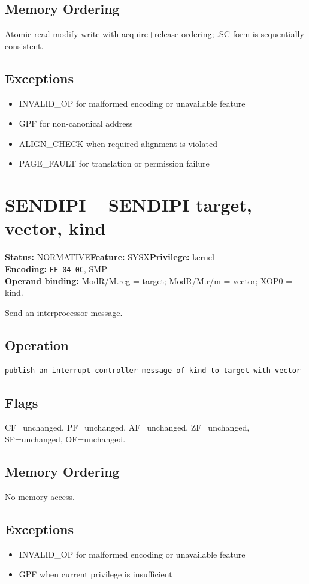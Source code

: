 \documentclass[10pt]{article}
\begin{document}
\subsection*{Memory Ordering}
Atomic read-modify-write with acquire+release ordering; .SC form is sequentially consistent.
\subsection*{Exceptions}
\begin{itemize}
\item INVALID\_OP for malformed encoding or unavailable feature
\item GPF for non-canonical address
\item ALIGN\_CHECK when required alignment is violated
\item PAGE\_FAULT for translation or permission failure
\end{itemize}
\clearpage

\section{SENDIPI -- SENDIPI target, vector, kind}
\textbf{Status:} NORMATIVE\quad \textbf{Feature:} SYSX\quad \textbf{Privilege:} kernel\\
\textbf{Encoding:} \texttt{FF 04 0C}, SMP\\
\textbf{Operand binding:} ModR/M.reg = target; ModR/M.r/m = vector; XOP0 = kind.

Send an interprocessor message.

\subsection*{Operation}
\begin{lstlisting}
publish an interrupt-controller message of kind to target with vector
\end{lstlisting}
\subsection*{Flags}
CF=unchanged, PF=unchanged, AF=unchanged, ZF=unchanged, SF=unchanged, OF=unchanged.
\subsection*{Memory Ordering}
No memory access.
\subsection*{Exceptions}
\begin{itemize}
\item INVALID\_OP for malformed encoding or unavailable feature
\item GPF when current privilege is insufficient
\end{itemize}
\clearpage
\end{document}

